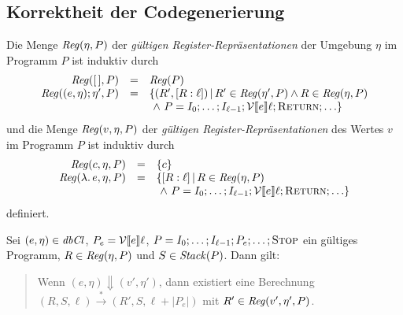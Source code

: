 \documentclass[12pt,fleqn,a4paper]{article}
\begin{document}
\subsection{Korrektheit der Codegenerierung}

\begin{definition}
  Die Menge ${\text{\it Reg\/}}(\eta,P)$ der {\em g\"ultigen Register-Repr\"asentationen} der Umgebung $\eta$ im Programm $P$ ist
  induktiv durch
  \[\begin{array}{rcl}
    {\text{\it Reg\/}}([\,],P) &=& {\text{\it Reg\/}}(P) \\
    {\text{\it Reg\/}}((e,\eta);\eta',P) &=& \{(R',[R:\ell])\,|\,R'\in{\text{\it Reg\/}}(\eta',P) \wedge R\in{\text{\it Reg\/}}(\eta,P) \\
    && \ \wedge\ P = I_0;\ldots;I_{\ell-1};\mathcal{V}\llbracket e \rrbracket\ell;\textsc{Return};\ldots\}
  \end{array}\]
  und die Menge ${\text{\it Reg\/}}(v,\eta,P)$ der {\em g\"ultigen Register-Repr\"asentationen} des Wertes $v$ im Programm
  $P$ ist induktiv durch
  \[\begin{array}{rcl}
    {\text{\it Reg\/}}(c,\eta,P) &=& \{c\} \\
    {\text{\it Reg\/}}(\lambda .\,e,\eta,P) &=& \{[R:\ell]\,|\,R\in{\text{\it Reg\/}}(\eta,P) \\
    && \ \wedge\ P = I_0;\ldots;I_{\ell-1};\mathcal{V}\llbracket e \rrbracket\ell;\textsc{Return};\ldots\}
  \end{array}\]
  definiert.
\end{definition}

\begin{lemma}
  Sei $(e,\eta)\in{\text{\it dbCl\/}}$, $P_e=\mathcal{V}\llbracket e \rrbracket\ell$, $P=I_0;\ldots;I_{\ell-1};P_e;\ldots;\textsc{Stop}$
  ein g\"ultiges Programm, $R\in{\text{\it Reg\/}}(\eta,P)$ und $S\in{\text{\it Stack\/}}(P)$. Dann gilt:
  \begin{quote}
    Wenn $(e,\eta) \Downarrow (v',\eta')$, dann existiert eine Berechnung \\
    $(R,S,\ell) \xrightarrow* (R',S,\ell+|P_e|)$ mit $R'\in{\text{\it Reg\/}}(v',\eta',P)$.
  \end{quote}
\end{lemma}
\end{document}
